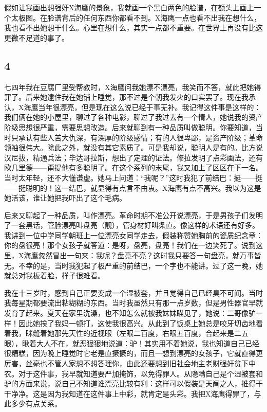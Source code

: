 假如让我画出想强奸X海鹰的景象，我就画一个黑白两色的脸谱，在额头上画上一个太极图。在脸谱背后的任何东西你都看不到。X海鹰一点也看不出我在想什么，我也看不出她想干什么。心里在想什么，其实一点都不重要。在世界上再没有比这更微不足道的事了。 

\subsection{4} 

七四年我在豆腐厂里受帮教时，X海鹰问我她漂不漂亮，我笑而不答，就此把她得罪了。后来她逮住我在她铺上睡觉，那不过是个朝我发火的口实罢了。现在我承认，X海鹰当年很漂亮，但是现在这么说已经于事无补。我记得这件事是这样的：我们俩在她的小屋里，聊过了各种电影，聊过了我过去有一个情人，她说我的资产阶级思想很严重，需要思想改造。后来就聊到有一种品质叫做聪明。你要知道，当时只承认有些人苦大仇深，有深厚的阶级感情；有的人很卑鄙，是资产阶级；革命领袖很伟大。除此之外，就没有其它素质了。可是我却说，聪明人是有的。比方说汉尼拔，精通兵法；毕达哥拉斯，想出了定理的证法。修拉发明了点彩画法，还有欧几里德——甭提他有多聪明了。在这个系列的末尾，我又加上了区区在下一名。当时太年轻，还不大懂谦虚。她马上问道：“我呢？”这时我犯了前结巴：挺——挺——挺聪明的！这一结巴，就显得有点言不由衷。X海鹰有点不高兴。我以为这是她活该，谁让她把我吓出了这个毛病。 

后来又聊起了一种品质，叫作漂亮。革命时期不准公开说漂亮，于是男孩子们发明了一套黑话，管脸漂亮叫盘亮（靓），管身材好叫条直。像这样的术语还有好多。我讲到一位中学同学朝班上一位漂亮女同学走去，假装称赞她胸前的瓷质纪念章：你的盘很亮！那个女孩子就答道：是呀，盘亮，盘亮！我们在一边笑死了。说到这里，X海鹰忽然冒出一句来：我呢？盘亮不亮？这时我只要答一句盘亮，就万事皆无。不幸的是，当时我犯起了极严重的前结巴，一个字也不能讲。过了这一晚，她就总对我板着脸，样子很难看。 

我在十三岁时，感到自己正要变成一个湿被套，并且觉得自己已经臭不可闻。当时我每星期都要流出粘糊糊的东西。当时我虽然只有那一点岁数，但是男性器官早就发育了起来。夏天在家里洗澡，也不知怎么就被我妹妹瞄见了，她说：二哥像驴一样！因此她挨了我妈一顿打，这使我很高兴。从此到了饭桌上她总是咬牙切齿地看着我，眯缝着她那先天性的近视眼（左眼二百度，右眼五百度，合起来是二五眼），瞅着大人不在，就恶狠狠地说道：驴！其实用不着她说，我也知道自己已经很糟糕，因为晚上睡觉时它老是直撅撅的，而且一想到漂亮的女孩子，它就直得更厉害，丝毫也不管人家想不想答理你，由此还要想到旧社会地主老财强奸贫下中农。对于这件事，我早就知道要严加掩饰，以免得罪人。从隐瞒自己是个湿被套和驴的方面来说，说自己不知道谁漂亮比较有利：这样可以假装是天阉之人，推得干干净净。这是因为我知道在这件事上中彩，就肯定是头彩。我把X海鹰得罪了，与此多少有点关系。 

